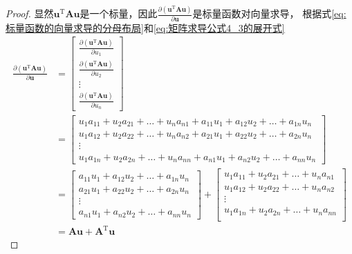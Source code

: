 \documentclass[withoutpreface,bwprint]{NoteBook}
\begin{document}
\begin{proof}
显然$\mathbf{u}^\mathrm{T} \mathbf{A} \mathbf{u} $是一个标量，因此$ \frac{\partial ( \mathbf{u}^\mathrm{T} \mathbf{A} \mathbf{u} )}{\partial \mathbf{u}}$是标量函数对向量求导，
根据式\cref{eq:标量函数的向量求导的分母布局}和\cref{eq:矩阵求导公式4_3的展开式}
\begin{align}
    \label{eq:矩阵求导公式4_3的证明式1}
    \nonumber
    \frac{\partial ( \mathbf{u}^\mathrm{T} \mathbf{A} \mathbf{u} )}{\partial \mathbf{u}}
    & \nonumber
    =
    \begin{bmatrix}
        \frac{\partial ( \mathbf{u}^\mathrm{T} \mathbf{A} \mathbf{u} )}{\partial u_1} \\
        \frac{\partial ( \mathbf{u}^\mathrm{T} \mathbf{A} \mathbf{u} )}{\partial u_2} \\
        \vdots \\
        \frac{\partial ( \mathbf{u}^\mathrm{T} \mathbf{A} \mathbf{u} )}{\partial u_n} 
    \end{bmatrix}\\
    & \nonumber
    =
    \begin{bmatrix}
        u_1 a_{11}  + u_2 a_{21} + \dots + u_n a_{n1} + a_{11} u_1+ a_{12} u_2 +\dots + a_{1n} u_n  \\
        u_1 a_{12}  + u_2 a_{22} + \dots + u_n a_{n2} + a_{21} u_1+ a_{22} u_2 +\dots + a_{2n} u_n   \\
        \vdots \\
        u_1 a_{1n}  + u_2 a_{2n} + \dots + u_n a_{nn} + a_{n1} u_1+ a_{n2} u_2 +\dots + a_{nn} u_n 
    \end{bmatrix}\\
    &\nonumber
    =
    \begin{bmatrix}
        a_{11} u_1+ a_{12} u_2 +\dots + a_{1n} u_n \\
        a_{21} u_1+ a_{22} u_2 +\dots + a_{2n} u_n  \\
        \vdots \\
        a_{n1} u_1+ a_{n2} u_2 +\dots + a_{nn} u_n 
    \end{bmatrix}
    +
    \begin{bmatrix}
        u_1 a_{11}  + u_2 a_{21} + \dots + u_n a_{n1}  \\
        u_1 a_{12}  + u_2 a_{22} + \dots + u_n a_{n2}  \\
        \vdots \\
        u_1 a_{1n}  + u_2 a_{2n} + \dots + u_n a_{nn} \\
    \end{bmatrix} \\
    &= \mathbf{A}\mathbf{u} + \mathbf{A}^\mathrm{T}\mathbf{u} 
\end{align}

\end{proof}
\end{document}
